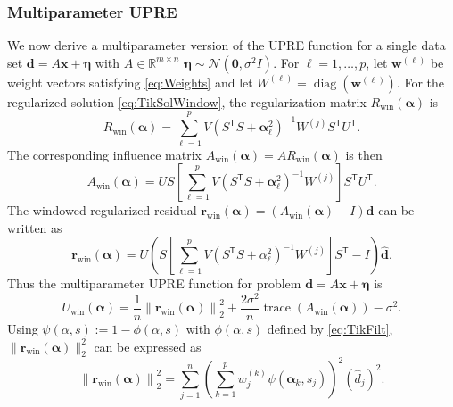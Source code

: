 \documentclass[12pt]{article}
\newcommand{\dVec}{\mathbf{d}}	%
\newcommand{\rVec}{\mathbf{r}}	%
\newcommand{\xVec}{\mathbf{x}}	%
\newcommand{\wVec}{\mathbf{w}}	%
\newcommand{\trans}[1]{{#1}^\mathsf{T}}	%
\newcommand{\inv}[1]{{#1}^{-1}}	%
\DeclareMathOperator{\trace}{trace}		%
\DeclareMathOperator{\diag}{diag}	%
\newcommand{\dft}[1]{\widehat{#1}}	%
\newcommand{\regparam}{\alpha}  %
\newcommand{\regparamVec}{\bm{\regparam}}   %
\newcommand{\filt}{\phi}
\newcommand{\mfilt}{\psi}
\newcommand{\noise}{\eta}	%
\newcommand{\noiseSD}{\sigma}	%
\newcommand{\noiseVec}{\bm{\noise}}	%
\newcommand{\zeroVec}{\bm{0}}	%
\newcommand{\singular}{s}	%
\begin{document}
\subsubsection{Multiparameter UPRE}
We now derive a multiparameter version of the UPRE function for a single data set $\dVec = A\xVec + \noiseVec$ with $A \in \mathbb{R}^{m \times n}$ $\noiseVec \sim \mathcal{N}(\zeroVec,\noiseSD^2 I)$. For $\ell = 1,\ldots,p$, let $\wVec^{(\ell)}$ be weight vectors satisfying \eqref{eq:Weights} and let $W^{(\ell)} = \diag(\wVec^{(\ell)})$. For the regularized solution \eqref{eq:TikSolWindow}, the regularization matrix $R_\text{win}(\regparamVec)$ is
\begin{equation}
\label{eq:Windowed Reg Matrix}
    R_\text{win}(\regparamVec) = \sum_{\ell=1}^p V\inv{\left(\trans{S}S + \regparamVec_{\ell}^2\right)}W^{(j)}\trans{S}\trans{U}.
\end{equation}
The corresponding influence matrix $A_\text{win}(\regparamVec) = AR_\text{win}(\regparamVec)$ is then
\begin{equation}
\label{eq:Windowed Influence Matrix}
    A_\text{win}(\regparamVec) = US\left[\sum_{\ell=1}^p V\inv{\left(\trans{S}S + \regparamVec_{\ell}^2\right)}W^{(j)}\right]\trans{S}\trans{U}. 
\end{equation}
The windowed regularized residual $\rVec_\text{win}(\regparamVec) = (A_\text{win}(\regparamVec) - I)\dVec$ can be written as
\begin{equation}
    \rVec_\text{win}(\regparamVec) = U\left(S\left[\sum_{\ell=1}^p V\inv{\left(\trans{S}S + \regparam_{\ell}^2\right)}W^{(j)}\right]\trans{S}-I\right)\dft{\dVec}.
\end{equation}
Thus the multiparameter UPRE function for problem $\dVec = A\xVec + \noiseVec$ is 
\begin{equation}
\label{eq:Multiparameter UPRE}
    U_\text{win}(\regparamVec) = \frac{1}{n}\left\|\rVec_\text{win}(\regparamVec)\right\|_2^2 + \frac{2\noiseSD^2}{n}\trace\left(A_\text{win}(\regparamVec)\right) - \noiseSD^2.
\end{equation}
Using $\mfilt(\regparam,\singular) := 1 - \filt(\regparam,\singular)$ with $\filt(\regparam,\singular)$ defined by \eqref{eq:TikFilt}, $\|\rVec_\text{win}(\regparamVec)\|_2^2$ can be expressed as
\begin{equation}
\label{eq:Windowed Regularized Residual}
    \left\|\rVec_\text{win}(\regparamVec)\right\|_2^2 = \sum_{j=1}^{n} \left(\sum_{k=1}^{p} w_j^{(k)} \mfilt\left(\regparamVec_{k},\singular_j\right) \right)^2 \left(\dft{d}_j\right)^2.
\end{equation}
\end{document}
